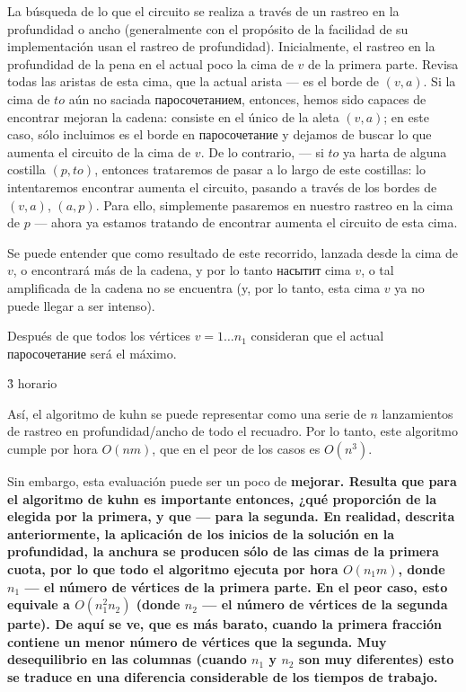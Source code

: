 La búsqueda de lo que el circuito se realiza a través de un rastreo en la profundidad o ancho (generalmente con el propósito de la facilidad de su implementación usan el rastreo de profundidad). Inicialmente, el rastreo en la profundidad de la pena en el actual poco la cima de $v$ de la primera parte. Revisa todas las aristas de esta cima, que la actual arista --- es el borde de $(v,a)$. Si la cima de $to$ aún no saciada паросочетанием, entonces, hemos sido capaces de encontrar mejoran la cadena: consiste en el único de la aleta $(v,a)$; en este caso, sólo incluimos es el borde en паросочетание y dejamos de buscar lo que aumenta el circuito de la cima de $v$. De lo contrario, --- si $to$ ya harta de alguna costilla $(p,to)$, entonces trataremos de pasar a lo largo de este costillas: lo intentaremos encontrar aumenta el circuito, pasando a través de los bordes de $(v,a)$, $(a,p)$. Para ello, simplemente pasaremos en nuestro rastreo en la cima de $p$ --- ahora ya estamos tratando de encontrar aumenta el circuito de esta cima.

Se puede entender que como resultado de este recorrido, lanzada desde la cima de $v$, o encontrará más de la cadena, y por lo tanto насытит cima $v$, o tal amplificada de la cadena no se encuentra (y, por lo tanto, esta cima $v$ ya no puede llegar a ser intenso).

Después de que todos los vértices $v = 1 \ldots n_1$ consideran que el actual паросочетание será el máximo.


\h3{ horario }

Así, el algoritmo de kuhn se puede representar como una serie de $n$ lanzamientos de rastreo en profundidad/ancho de todo el recuadro. Por lo tanto, este algoritmo cumple por hora $O (n m)$, que en el peor de los casos es $O (n^3)$.

Sin embargo, esta evaluación puede ser un poco de \bf{mejorar}. Resulta que para el algoritmo de kuhn es importante entonces, ¿qué proporción de la elegida por la primera, y que --- para la segunda. En realidad, descrita anteriormente, la aplicación de los inicios de la solución en la profundidad, la anchura se producen sólo de las cimas de la primera cuota, por lo que todo el algoritmo ejecuta por hora $O (n_1 m)$, donde $n_1$ --- el número de vértices de la primera parte. En el peor caso, esto equivale a $O (n_1^2 n_2)$ (donde $n_2$ --- el número de vértices de la segunda parte). De aquí se ve, que es más barato, cuando la primera fracción contiene un menor número de vértices que la segunda. Muy desequilibrio en las columnas (cuando $n_1$ y $n_2$ son muy diferentes) esto se traduce en una diferencia considerable de los tiempos de trabajo.



